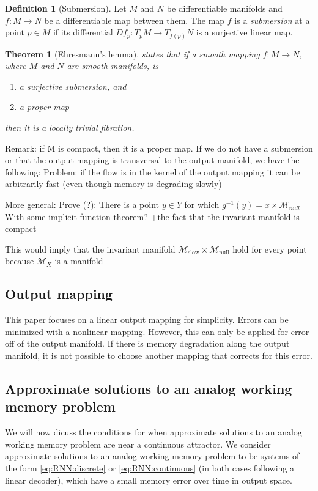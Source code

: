 \documentclass{article} %
\newcounter{ct}
\newcommand{\manifold}{\mathcal{M}}
\newtheorem{theorem}{Theorem}
\theoremstyle{definition}
\newtheorem{definition}{Definition}
\theoremstyle{remark}
\begin{document}
\begin{definition}[Submersion]
Let \(M\) and \(N\) be differentiable manifolds and \(f\colon M\to N\) be a differentiable map between them.
 The map \(f\) is a \emph{submersion} at a point \(p\in M\) if its differential \(Df_{p}\colon T_{p}M\to T_{f(p)}N\) is a surjective linear map.
\end{definition}

\begin{theorem}[Ehresmann's lemma]
states that if a smooth mapping \(f\colon M\rightarrow N\), where \(M\) and \(N\) are smooth manifolds, is
 \begin{enumerate}
\item a surjective submersion, and
\item a proper map
\end{enumerate}
then it is a locally trivial fibration.
\end{theorem}

Remark: if M is compact, then it is a proper map.
If we do not have a submersion or that the output mapping is transversal to the output manifold, we have the following:
Problem: if the flow is in the kernel of the output mapping it can be arbitrarily fast (even though memory is degrading slowly)



More general:
Prove (?): There is a point \(y\in Y\) for which \(g^{-1}(y)={x}\times \manifold_{null}\) 
With some implicit function theorem?
+the fact that the invariant manifold is compact

This would imply that the invariant manifold \( \manifold_{\text{slow}}\times \manifold_{\text{null}}\) hold for every point because \(\manifold_X\) is a manifold



\subsection{Output mapping}
This paper focuses on a linear output mapping for simplicity.
Errors can be minimized with a nonlinear mapping.
However, this can only be applied for error off of the output manifold. 
If there is memory degradation along the output manifold, it is not possible to choose another mapping that corrects for this error.



\subsection{Approximate solutions  to an analog working memory problem}\label{sec:condition_clarifications}
We will now dicuss the conditions for when approximate solutions to an analog working memory problem are near a continuous attractor.
We consider approximate solutions to an analog working memory problem to be systems of the form \ref{eq:RNN:discrete} or \ref{eq:RNN:continuous} (in both cases following a linear decoder), which have a small memory error over time in output space.
\end{document}
